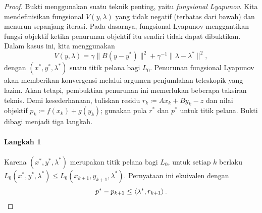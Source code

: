 \begin{proof}
    Bukti menggunakan suatu teknik penting, yaitu \emph{fungsional Lyapunov}. Kita mendefinisikan fungsional $V(y,\lambda)$ yang tidak negatif (terbatas dari bawah) dan menurun sepanjang iterasi. Pada dasarnya, fungsional Lyapunov menggantikan fungsi objektif ketika penurunan objektif itu sendiri tidak dapat dibuktikan. Dalam kasus ini, kita menggunakan
    \begin{equation}
        V(y,\lambda) = \gamma \|B(y-y^*)\|^2 + \gamma^{-1} \|\lambda-\lambda^*\|^2,
    \end{equation}
    dengan $(x^*,y^*,\lambda^*)$ suatu titik pelana bagi $L_0$. Penurunan fungsional Lyapunov akan memberikan konvergensi melalui argumen penjumlahan teleskopik yang lazim. Akan tetapi, pembuktian penurunan ini memerlukan beberapa taksiran teknis. Demi kesederhanaan, tuliskan residu $r_k \coloneq Ax_k + By_k-z$ dan nilai objektif $p_k \coloneq f(x_k) + g(y_k)$; gunakan pula $r^*$ dan $p^*$ untuk titik pelana. Bukti dibagi menjadi tiga langkah.
    \paragraph{Langkah 1}
    Karena $(x^*,y^*,\lambda^*)$ merupakan titik pelana bagi $L_0$, untuk setiap $k$ berlaku $L_0(x^*,y^*,\lambda^*)\leq L_0(x_{k+1},y_{k+1},\lambda^*)$. Pernyataan ini ekuivalen dengan
    \begin{equation}\label{duality:eq:proof_admm1}
        p^*-p_{k+1}\leq \left\langle\lambda^* , r_{k+1}\right\rangle.
    \end{equation}

\end{proof}
